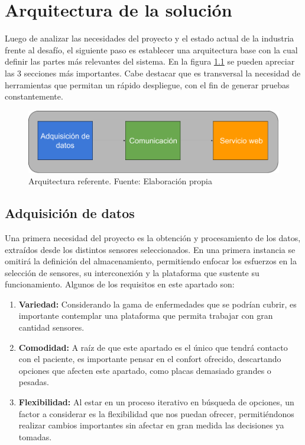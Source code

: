 \chapter{Arquitectura de la solución}\label{arquitectura}

Luego de analizar las necesidades del proyecto y el estado actual de la industria frente al desafío, el siguiente paso es establecer una arquitectura base con la cual definir las partes más relevantes del sistema. En la figura \ref{arqui} se pueden apreciar las 3 secciones más importantes. Cabe destacar que es transversal la necesidad de herramientas que permitan un rápido despliegue, con el fin de generar pruebas constantemente.

\begin{figure}[H]
	\centering
	\includegraphics[scale=0.43]{figuras/arquitectura/arqui.png}
	\caption{Arquitectura referente. Fuente: Elaboración propia}
	\label{arqui}
\end{figure}

\newpage
\section{Adquisición de datos}
Una primera necesidad del proyecto es la obtención y procesamiento de los datos, extraídos desde los distintos sensores seleccionados. En una primera instancia se omitirá la definición del almacenamiento, permitiendo enfocar los esfuerzos en la selección de sensores, su interconexión y la plataforma que sustente su funcionamiento. Algunos de los requisitos en este apartado son:

\begin{enumerate}
	\item \textbf{Variedad:}
	Considerando la gama de enfermedades que se podrían cubrir, es importante contemplar una plataforma que permita trabajar con gran cantidad sensores.
	\item \textbf{Comodidad:}
	A raíz de que este apartado es el único que tendrá contacto con el paciente, es importante pensar en el confort ofrecido, descartando opciones que afecten este apartado, como placas demasiado grandes o pesadas.
	\item \textbf{Flexibilidad:}
	Al estar en un proceso iterativo en búsqueda de opciones, un factor a considerar es la flexibilidad que nos puedan ofrecer, permitiéndonos realizar cambios importantes sin afectar en gran medida las decisiones ya tomadas.
\end{enumerate}

